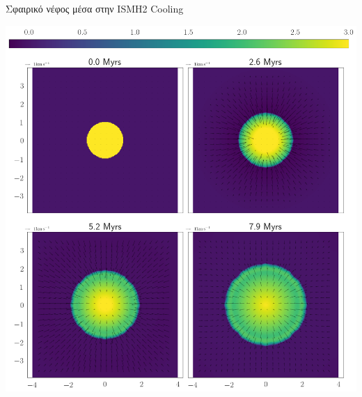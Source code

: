 \documentclass{beamer}
\begin{document}
\begin{frame}{Σφαιρικό νέφος μέσα στην ISM}{Η2 Cooling}
			\begin{center}
				\includegraphics[width=0.6\linewidth]{../Document/DataImages/H2CoolingRHOquad}
			\end{center}

\end{frame}
\end{document}
